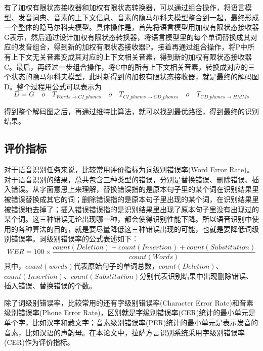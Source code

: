 有了加权有限状态接收器和加权有限状态转换器，可以通过组合操作，将语言模型、发音词典、音素的上下文信息、音素的隐马尔科夫模型整合到一起，最终形成一个整体的隐马尔科夫模型。具体操作是，首先将语言模型用加权有限状态接收器G表示，然后通过设计加权有限状态转换器，将语言模型里的每个单词替换成其对应的发音组合，得到新的加权有限状态接收器P。接着再通过组合操作，将P中所有上下文无关音素变成其对应的上下文相关音素，得到新的加权有限状态接收器C。最后，再经过一步组合操作，将C中的所有上下文相关音素，转换成对应的三个状态的隐马尔科夫模型，此时新得到的加权有限状态接收器，就是最终的解码图D。整个过程用公式可以表示为\begin{equation}D=G\quad o \quad T_{Words\rightarrow CI\_phones} \quad o \quad T_{CI\_phones\rightarrow CD\_phones} \quad o \quad T_{CD\_phones \rightarrow HMMs}\end{equation}

得到整个解码图之后，再通过维特比算法，就可以找到最优路径，得到最终的识别结果。

\subsection{评价指标}
对于语音识别任务来说，比较常用评价指标为词级别错误率(Word Error Rate)。对于语音识别的结果，总共包含三种类型的错误，分别是替换错误、删除错误、插入错误。从字面意思上来理解，替换错误指的是原本句子里的某个词在识别结果里被错误替换成其它的词；删除错误指的是原本句子里出现的某个词，在识别结果里被错误地去掉了；插入错误错误指的是识别结果里出现了原本句子里没有出现过的某个词。这三种错误无论出现哪一种，都会使得识别性能下降。所以语音识别中使用的各种算法的目的，就是要尽量降低这三种错误出现的可能，也就是要降低词级别错误率。词级别错误率的公式表述如下：
\begin{equation}WER=100\times\frac{count(Deletion)+count(Insertion)+count(Substitution)}{count(Words)}\end{equation}
其中，$count(words)$代表原始句子的单词总数，$count(Deletion)$、$count(Insertion)$、$count(Substitution)$分别代表识别结果中出现删除错误、插入错误、替换错误的个数。

除了词级别错误率，比较常用的还有字级别错误率(Character Error Rate)和音素级别错误率(Phone Error Rate)，区别就是字级别错误率(CER)统计的最小单元是单个字，比如汉字和藏文字；音素级别错误率(PER)统计的最小单元是表示发音的音素，比如汉语的声韵母。在本论文中，拉萨方言识别系统采用字级别错误率(CER)作为评价指标。

